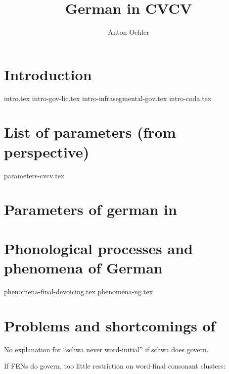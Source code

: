 \documentclass[
]{scrartcl}
\title{German in CVCV}
\author{Anton Oehler}
\begin{document}
\maketitle


\tableofcontents

\section{Introduction}
{intro.tex}
{intro-gov-lic.tex}
{intro-infrasegmental-gov.tex}
{intro-coda.tex}


\section{List of parameters (from \CVCV perspective)}
{parameters-cvcv.tex}

\section{Parameters of german in \CVCV}

\section{Phonological processes and phenomena of German}
{phenomena-final-devoicing.tex}
{phenomena-ng.tex}

\section{Problems and shortcomings of \CVCV}
No explanation for \enquote{schwa never word-initial} if schwa does govern.

If \glspl{FEN} do govern, too little restriction on word-final consonant
clusters:

\ti{*[Sa:fk]}
\begin{structure}
  \wordstart
  \emptyV
  \fen
\end{structure}
\end{document}
